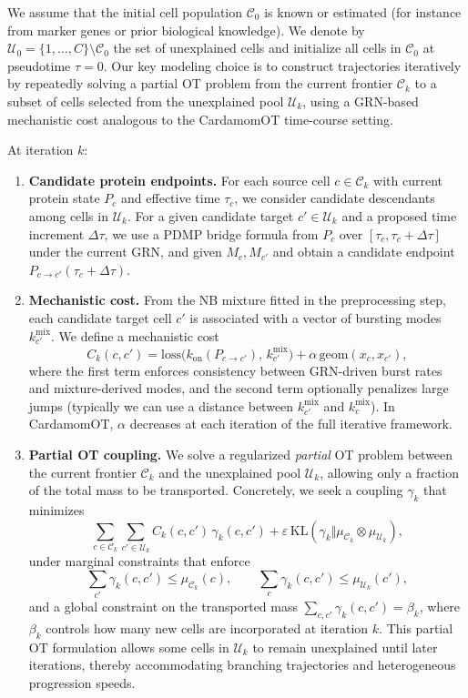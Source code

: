 \documentclass[10pt]{article}
\begin{document}
We assume that the initial cell population $\mathcal{C}_0$ is known or estimated (for instance from marker genes or prior biological knowledge). We denote by $\mathcal{U}_0 = \{1,\dots,C\}\setminus \mathcal{C}_0$ the set of unexplained cells and initialize all cells in $\mathcal{C}_0$ at pseudotime $\tau=0$. Our key modeling choice is to construct trajectories iteratively by repeatedly solving a partial OT problem from the current frontier $\mathcal{C}_k$ to a subset of cells selected from the unexplained pool $\mathcal{U}_k$, using a GRN-based mechanistic cost analogous to the CardamomOT time-course setting. 

At iteration $k$:
\begin{enumerate}
    \item \textbf{Candidate protein endpoints.}
    For each source cell $c\in\mathcal{C}_k$ with current protein state $P_c$ and effective time $\tau_c$, we consider candidate descendants among cells in $\mathcal{U}_k$. For a given candidate target $c'\in\mathcal{U}_k$ and a proposed time increment $\Delta\tau$, we use a PDMP bridge formula
    from $P_c$ over $[\tau_c,\tau_c+\Delta\tau]$ under the current GRN, and given $M_{c}, M_{c'}$ and obtain a candidate endpoint $P_{c\to c'}(\tau_c+\Delta\tau)$. 
    
    \item \textbf{Mechanistic cost.}
    From the NB mixture fitted in the preprocessing step, each candidate target cell $c'$ is associated with a vector of bursting modes $k^{\mathrm{mix}}_{c'}$. We define a mechanistic cost
    \[
    C_k(c,c') = \mathrm{loss}\bigl(k_{\mathrm{on}}(P_{c\to c'}),\,k^{\mathrm{mix}}_{c'}\bigr)
    +
    \alpha\,\mathrm{geom}(x_c,x_{c'}),
    \]
    where the first term enforces consistency between GRN-driven burst rates and mixture-derived modes, and the second term optionally penalizes large jumps (typically we can use a distance between $k^{\mathrm{mix}}_{c'}$ and $k^{\mathrm{mix}}_{c}$). In CardamomOT, $\alpha$ decreases at each iteration of the full iterative framework.
    
    \item \textbf{Partial OT coupling.}
    We solve a regularized \emph{partial} OT problem between the current frontier $\mathcal{C}_k$ and the unexplained pool $\mathcal{U}_k$, allowing only a fraction of the total mass to be transported. Concretely, we seek a coupling $\gamma_k$ that minimizes
    \[
    \sum_{c\in\mathcal{C}_k}\sum_{c'\in\mathcal{U}_k} C_k(c,c')\,\gamma_k(c,c')
    + \varepsilon\,\mathrm{KL}(\gamma_k\Vert \mu_{\mathcal{C}_k}\otimes\mu_{\mathcal{U}_k}),
    \]
    under marginal constraints that enforce
    \[
    \sum_{c'}\gamma_k(c,c') \leq \mu_{\mathcal{C}_k}(c),\qquad
    \sum_{c}\gamma_k(c,c') \leq \mu_{\mathcal{U}_k}(c'),
    \]
    and a global constraint on the transported mass 
    $\sum_{c,c'}\gamma_k(c,c') = \beta_k$, where $\beta_k$ controls how many new cells are incorporated at iteration $k$. 
    This partial OT formulation allows some cells in $\mathcal{U}_k$ to remain unexplained until later iterations, thereby accommodating branching trajectories and heterogeneous progression speeds. 
\end{enumerate}
\end{document}

